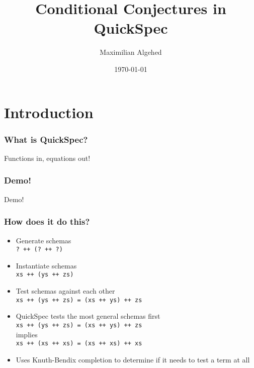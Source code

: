 \documentclass{beamer}
\title[Conditional Conjectures in QuickSpec]{Conditional Conjectures in QuickSpec} %
\author{Maximilian Algehed} %
\institute[CTH] %
{
Chalmers Tekniska Högskola \\ %
\medskip
\textit{m.algehed@gmail.com} %
}
\date{\today} %
\begin{document}
\begin{frame}
\titlepage %
\end{frame}



\section{Introduction} %

\begin{frame}
    \frametitle{What is QuickSpec?}
    \Large{\centerline{Functions in, equations out!}}
\end{frame}

\begin{frame}
    \frametitle{Demo!}
    \Huge{\centerline{Demo!}}
\end{frame}

\begin{frame}
    \frametitle{How does it do this?}
        \begin{itemize}
            \item Generate schemas\\\texttt{? ++ (? ++ ?)}
            \item Instantiate schemas\\\texttt{xs ++ (ys ++ zs)}
            \item Test schemas against each other\\\texttt{xs ++ (ys ++ zs) = (xs ++ ys) ++ zs}
            \item QuickSpec tests the most general schemas first\\
                \texttt{xs ++ (ys ++ zs) = (xs ++ ys) ++ zs}\\implies\\\texttt{xs ++ (xs ++ xs) = (xs ++ xs) ++ xs}
            \item Uses Knuth-Bendix completion to determine if it needs to test a term at all
        \end{itemize}
\end{frame}
\end{document}
